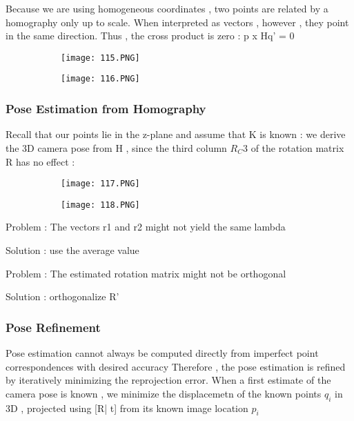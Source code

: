 \documentclass{article}
\begin{document}
Because we are using homogeneous coordinates , two points are related by a homography only up to scale. When interpreted as vectors , however , they point in the same direction. Thus , the cross product is zero : p x Hq' = 0

\begin{figure}[ht!]
  \centering
  \begin{subfigure}[b]{0.4\linewidth}
    \texttt{[image: 115.PNG]}
  \end{subfigure}
  \begin{subfigure}[b]{0.4\textwidth}
         \centering
         \texttt{[image: 116.PNG]}
     \end{subfigure}
\end{figure}


\subsubsection{Pose Estimation from Homography}

Recall that our points lie in the z-plane and assume that K is known : we derive the 3D camera pose from H , since the third column $R_C3$ of the rotation matrix R has no effect :

\begin{figure}[ht!]
  \centering
  \begin{subfigure}[b]{0.4\linewidth}
    \texttt{[image: 117.PNG]}
  \end{subfigure}
  \begin{subfigure}[b]{0.4\textwidth}
         \centering
         \texttt{[image: 118.PNG]}
     \end{subfigure}
\end{figure}

Problem : The vectors r1 and r2 might not yield the same lambda

Solution : use the average value

Problem : The estimated rotation matrix might not be orthogonal

Solution : orthogonalize R'

\subsubsection{Pose Refinement}

Pose estimation cannot always be computed directly from imperfect point correspondences with desired accuracy
Therefore , the pose estimation is refined by iteratively minimizing the reprojection error.
When a first estimate of the camera pose is known , we minimize the displacemetn of the known points $q_i$ in 3D , projected using [R| t] from its known image location $p_i$
\end{document}

